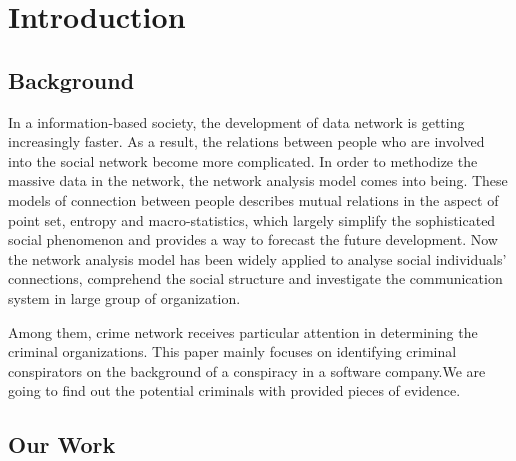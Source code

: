 \documentclass[12pt]{article}
\begin{document}
\section{Introduction}
\subsection{Background}
        
        In a information-based society, the development of data network is getting increasingly faster. As a result, the relations between people who  are involved into the social network become more complicated. In order to methodize the massive data in the network, the network analysis model comes into being. These models of connection between people describes mutual relations in the aspect of point set, entropy and macro-statistics, which largely simplify  the sophisticated social phenomenon and provides a  way to forecast the future development. Now the network analysis model has been widely applied to analyse social individuals’ connections, comprehend the social structure\cite{A1}\cite{A2} and investigate the communication system in large group of organization\cite{A3}\cite{A4}.    
	
	Among them, crime network receives particular attention in  determining the criminal organizations\cite{A5}. This paper mainly focuses on identifying criminal conspirators on the background of a conspiracy in a software company.We are going to find out the potential criminals with provided pieces of evidence.
	
\subsection{Our Work}
\end{document}
